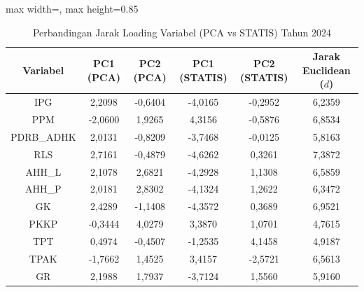 \begin{table}[H]
\centering
\caption{Perbandingan Jarak Loading Variabel (PCA vs STATIS) Tahun 2024} \label{tab:app2jarak_loading_2024}
\begin{adjustbox}{max width=\textwidth, max height=0.85\textheight}
\begin{tabular}{|c|c|c|c|c|c|}
\hline
\textbf{Variabel} & \textbf{PC1 (PCA)} & \textbf{PC2 (PCA)} & \textbf{PC1 (STATIS)} & \textbf{PC2 (STATIS)} & \textbf{Jarak Euclidean ($d$)} \\
\hline
IPG & 2,2098 & -0,6404 & -4,0165 & -0,2952 & 6,2359 \\
PPM & -2,0600 & 1,9265 & 4,3156 & -0,5876 & 6,8534 \\
PDRB\_ADHK & 2,0131 & -0,8209 & -3,7468 & -0,0125 & 5,8163 \\
RLS & 2,7161 & -0,4879 & -4,6262 & 0,3261 & 7,3872 \\
AHH\_L & 2,1078 & 2,6821 & -4,2928 & 1,1308 & 6,5859 \\
AHH\_P & 2,0181 & 2,8302 & -4,1324 & 1,2622 & 6,3472 \\
GK & 2,4289 & -1,1408 & -4,3572 & 0,3689 & 6,9521 \\
PKKP & -0,3444 & 4,0279 & 3,3870 & 1,0701 & 4,7615 \\
TPT & 0,4974 & -0,4507 & -1,2535 & 4,1458 & 4,9187 \\
TPAK & -1,7662 & 1,4525 & 3,4157 & -2,5721 & 6,5613 \\
GR & 2,1988 & 1,7937 & -3,7124 & 1,5560 & 5,9160 \\
\hline
\end{tabular}
\end{adjustbox}
\end{table}